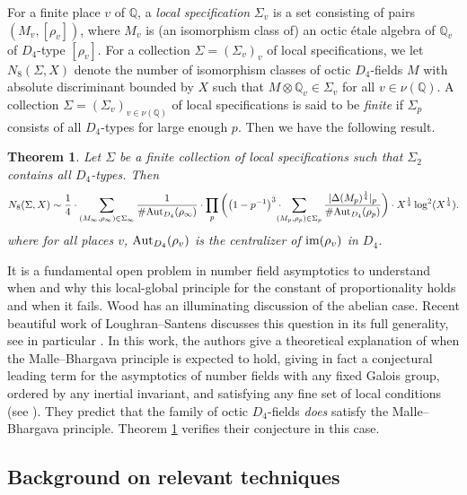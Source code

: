 \documentclass[10pt]{article}
\theoremstyle{plain}
\newtheorem{theorem}{Theorem}
\theoremstyle{definition}
\theoremstyle{remark}
\DeclareMathOperator{\Aut}{Aut}
\def\Aut{{\rm Aut}}
\def\im{{\rm im}}
\def\Disc{{\Delta}}
\def\Val{{\nu}}
\def\bQ{{\mathbb Q}}
\def\bQ{{\mathbb Q}}
\begin{document}
For a finite place $v$ of $\bQ$, a {\em local specification}
$\Sigma_v$ is a set consisting of pairs $(M_v,[\rho_v])$, where $M_v$
is (an isomorphism class of) an octic \'etale algebra of $\bQ_v$ of
$D_4$-type $[\rho_v]$. For a collection $\Sigma=(\Sigma_v)_v$ of local
specifications, we let $N_{8}(\Sigma,X)$ denote the number of
isomorphism classes of octic $D_4$-fields $M$ with absolute
discriminant bounded by $X$ such that $M \otimes \bQ_v \in \Sigma_v$
for all $v \in \Val(\bQ)$.
A collection $\Sigma = (\Sigma_v)_{v \in \Val(\bQ)}$ of local
specifications is said to be \emph{finite} if $\Sigma_p$ consists of
all $D_4$-types for large enough $p$. Then we have the following
result.


\begin{theorem}\label{congruence conditions}
Let $\Sigma$ be a finite collection of local specifications such that
$\Sigma_2$ contains all $D_4$-types. Then
\begin{equation*}
  N_{8}(\Sigma,X) \sim \frac{1}{4}\cdot \sum_{(M_\infty,\rho_\infty) \in
    \Sigma_\infty}\frac{1}{\#\Aut_{D_4}(\rho_\infty)}\cdot \prod_p \, \biggl(\bigl(1-{p}^{-1}\bigr)^3 \cdot
  \hspace{-7pt}\sum_{(M_p,\rho_p) \in
    \Sigma_p}\frac{|\Disc(M_p)^{\frac14}|_p}{\#\Aut_{D_4}(\rho_p)}\biggr)
  \cdot X^{\frac14}\log^2(X^{\frac14}).
\end{equation*}
where for all places $v$, $\Aut_{D_4}(\rho_v)$ is the
centralizer of $\im(\rho_v)$ in $D_4$.
\end{theorem}

It is a fundamental open problem in number field asymptotics to understand when
and why this local-global principle for the constant of
proportionality holds and when it fails. Wood \cite{MR2581243} has an illuminating discussion
of the abelian case.
Recent beautiful work of Loughran--Santens \cite{LS} discusses this question in its full generality, see in particular \cite[Remark 1.7]{LS}.
In this work, the authors give a theoretical explanation of when the Malle--Bhargava principle is expected to hold, giving in fact a conjectural leading term for the asymptotics of number fields with any fixed Galois group, ordered by any inertial invariant, and satisfying any fine set of local conditions (see \cite[Conjecture 9.10]{LS}). They predict that the family of octic $D_4$-fields {\em does} satisfy the Malle--Bhargava principle. Theorem \ref{congruence conditions} verifies their conjecture in this case.


\subsection{Background on relevant techniques}
\end{document}
